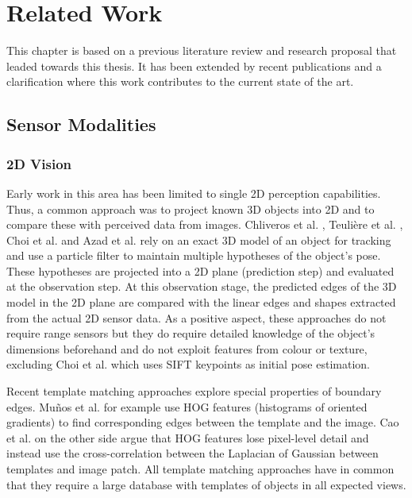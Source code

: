 \chapter{Related Work}
\label{sec:related_work}

This chapter is based on a previous literature review and research proposal that leaded towards this thesis. It has been extended by recent publications and a clarification where this work contributes to the current state of the art.


\section{Sensor Modalities}

\subsection{2D Vision}
Early work in this area has been limited to single 2D perception capabilities. Thus, a common approach was to project known 3D objects into 2D and to compare these with perceived data from images. Chliveros et al. \cite{Chliveros2013}, Teuli\`ere et al. \cite{Teuliere2010}, Choi et al. \cite{Choi2012} and Azad et al. \cite{Azad2011} rely on an exact 3D model of an object for tracking and use a particle filter to maintain multiple hypotheses of the object's pose. These hypotheses are projected into a 2D plane (prediction step) and evaluated at the observation step. At this observation stage, the predicted edges of the 3D model in the 2D plane are compared with the linear edges and shapes extracted from the actual 2D sensor data. As a positive aspect, these approaches do not require range sensors but they do require detailed knowledge of the object's dimensions beforehand and do not exploit features from colour or texture, excluding Choi et al. which uses SIFT keypoints as initial pose estimation.

Recent template matching approaches explore special properties of boundary edges. Mu\~nos et al. \cite{Munoz2016} for example use HOG features (histograms of oriented gradients) to find corresponding edges between the template and the image. Cao et al. \cite{Cao2016} on the other side argue that HOG features lose pixel-level detail and instead use the cross-correlation between the Laplacian of Gaussian between templates and image patch. All template matching approaches have in common that they require a large database with templates of objects in all expected views.

